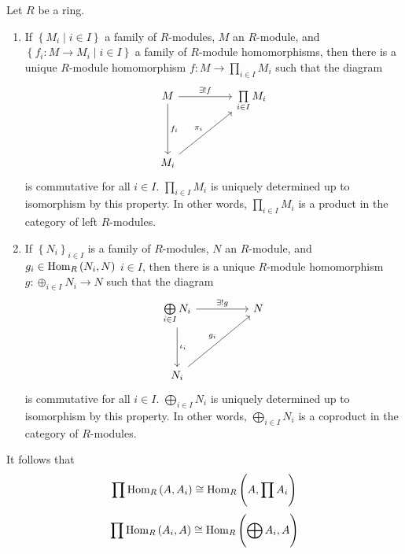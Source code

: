 \begin{theorem}
    Let $R$ be a ring.
    \begin{enumerate}
        \item
              If $\left\{M_i \mid i \in I\right\}$ a family of $R$-modules, $M$ an $R$-module, and
              $\left\{f_i: M \rightarrow M_i \mid i \in I\right\}$
              a family of $R$-module homomorphisms, then there is a unique $R$-module homomorphism
              $f: M \rightarrow \prod_{i \in I} M_i$
              such that the diagram
              \begin{equation*}
                  \begin{tikzcd}
                      M \arrow[rr,"\exists!f"]\arrow[dd,"f_i" ]& &\prod\limits_{i \in I} M_i \\
                      & & \\
                      M_i \arrow[rruu,"\pi_i"]& &
                  \end{tikzcd}
              \end{equation*}
              is commutative for all ${i} \in I$.
              $ \prod_{i \in I} M_i$ is uniquely determined up to isomorphism by this property. In other words, $\prod_{i \in I} M_i$ is a product in the category of left $R$-modules.
        \item
              If $\left\{N_i\right\}_{i\in I}$ is a family of $R$-modules, $N$ an $R$-module, and
              $g_i\in \operatorname{\operatorname{Hom}}_R\left(N_i,N\right)$ $i\in I$, then there is a unique $R$-module homomorphism $g: \oplus_{i \in I} N_i \rightarrow N$ such that the diagram
              \begin{equation*}
                  \begin{tikzcd}
                      \bigoplus\limits_{i\in I}N_i \arrow[rr,"\exists!g"] \arrow[dd,"\iota_i"]& & N \\
                      & &\\
                      N_i \arrow[rruu,"g_i"]& &
                  \end{tikzcd}
              \end{equation*}
              is commutative for all ${i} \in I$.
              $ \bigoplus_{i \in I} N_i$ is uniquely determined up to isomorphism by this property. In other words, $\bigoplus_{i \in I} N_i$ is a coproduct in the category of $R$-modules.
    \end{enumerate}
    \begin{remark}
        It follows that
        \begin{equation*}
            \prod \operatorname{\operatorname{Hom}}_R\left(A,A_i\right) \cong \operatorname{\operatorname{Hom}}_{R}\left(A,\prod_{}A_i\right)
        \end{equation*}
        \begin{equation*}
            \prod \operatorname{\operatorname{Hom}}_R\left(A_i,A\right) \cong \operatorname{\operatorname{Hom}}_{R}\left(\bigoplus_{}A_i,A\right)
        \end{equation*}
    \end{remark}
\end{theorem}

